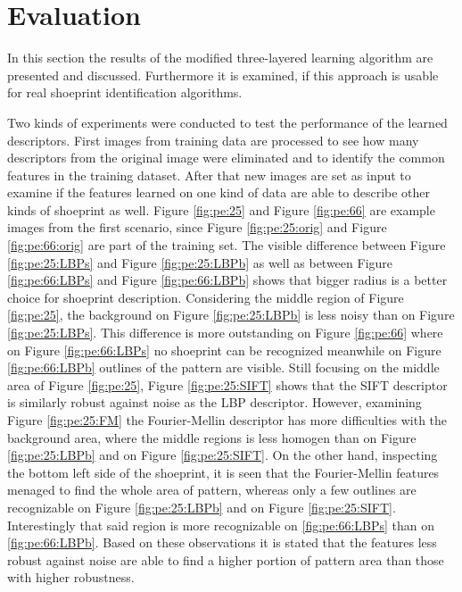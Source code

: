 \documentclass[draft,final]{vutinfth} %
\begin{document}
\section{Evaluation}
\par
In this section the results of the modified three-layered learning algorithm are presented and discussed.
Furthermore it is examined, if this approach is usable for real shoeprint identification algorithms.
\par
Two kinds of experiments were conducted to test the performance of the learned descriptors.
First images from training data are processed to see how many descriptors from the original image were eliminated and to identify the common features in the training dataset.
After that new images are set as input to examine if the features learned on one kind of data are able to describe other kinds of shoeprint as well.
Figure \ref{fig:pe:25} and Figure \ref{fig:pe:66} are example images from the first scenario, since Figure \ref{fig:pe:25:orig} and Figure \ref{fig:pe:66:orig} are part of the training set.
The visible difference between Figure \ref{fig:pe:25:LBPs} and Figure \ref{fig:pe:25:LBPb} as well as between Figure \ref{fig:pe:66:LBPs} and Figure \ref{fig:pe:66:LBPb} shows that bigger radius is a better choice for shoeprint description.
Considering the middle region of Figure \ref{fig:pe:25}, the background on Figure \ref{fig:pe:25:LBPb} is less noisy than on Figure \ref{fig:pe:25:LBPs}.
This difference is more outstanding on  Figure \ref{fig:pe:66} where on Figure \ref{fig:pe:66:LBPs} no shoeprint can be recognized meanwhile on Figure \ref{fig:pe:66:LBPb} outlines of the pattern are visible.
Still focusing on the middle area of Figure \ref{fig:pe:25}, Figure \ref{fig:pe:25:SIFT} shows that the SIFT descriptor is similarly robust against noise as the LBP descriptor.
However, examining Figure  \ref{fig:pe:25:FM} the Fourier-Mellin descriptor has more difficulties with the background area, where the middle regions is less homogen than on  Figure \ref{fig:pe:25:LBPb} and on Figure \ref{fig:pe:25:SIFT}.
On the other hand, inspecting the bottom left side of the shoeprint, it is seen that the Fourier-Mellin features menaged to find the whole area of pattern, whereas only a few outlines are recognizable on Figure \ref{fig:pe:25:LBPb} and on Figure \ref{fig:pe:25:SIFT}.
Interestingly that said region is more recognizable on  \ref{fig:pe:66:LBPs} than on  \ref{fig:pe:66:LBPb}.
Based on these observations it is stated that the features less robust against noise are able to find a higher portion of pattern area than those with higher robustness.
\end{document}
